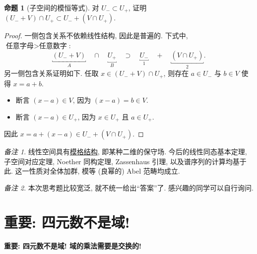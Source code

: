 \documentclass[11pt]{ctexart}
\theoremstyle{definition}
\numberwithin{equation}{section}
\theoremstyle{definition}
\newtheorem*{proposition}{命题}
\theoremstyle{remark}
\newtheorem*{remark}{备注}
\begin{document}
\begin{proposition}[子空间的模恒等式]
    对 $U_-\subset U_+$, 证明 $(U_-+V)\cap U_+\subset U_-+(V\cap U_+)$. 
    \begin{proof}
        一侧包含关系不依赖线性结构, 因此是普遍的. 下式中, $\text{任意字母}>\text{任意数字}$: 
        \begin{equation}
            \underset{A}{\underbracket{(U_-+V)}}\quad \cap\quad \underset{B}{\underbracket{U_+}}\quad \supset \quad \underset{1}{\underbracket{U_-}}\quad +\quad \underset{2}{\underbracket{(V\cap U_+)}}. 
        \end{equation}
        另一侧包含关系证明如下. 任取 $x\in (U_-+V)\cap U_+$, 则存在 $a\in U_-$ 与 $b\in V$ 使得 $x=a+b$. 
        \begin{itemize}
            \item 断言 $(x-a)\in V$, 因为 $(x-a)=b\in V$. 
            \item 断言 $(x-a)\in U_+$, 因为 $x\in U_+$ 且 $a\in U_+$.
        \end{itemize}
因此 $x=a+(x-a)\in U_- + (V\cap U_+)$. 
    \end{proof}
\end{proposition}

\begin{remark}
    线性空间具有\href{https://en.wikipedia.org/wiki/Modular_lattice}{模格结构}, 即某种二维的保守场. 今后的线性同态基本定理, 子空间对应定理, Noether 同构定理, Zassenhaus 引理, 以及谱序列的计算均基于此. 这一性质对全体加群, 模等 (良幂的) Abel 范畴均成立. 
\end{remark}

\begin{remark}
    本次思考题比较宽泛, 就不统一给出``答案''了. 感兴趣的同学可以自行询问.
\end{remark}

\section{\textbf{重要: 四元数不是域!}}

\begin{pinked}
    \textbf{重要: 四元数不是域! 域的乘法需要是交换的!} 
\end{pinked}
\end{document}

